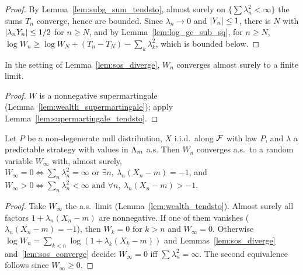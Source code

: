 \begin{proof}
  \leanok
  By Lemma~\ref{lem:subg_sum_tendsto}, almost surely on $\{\sum \lambda_n^2 < \infty\}$ the sums
  $T_n$ converge, hence are bounded. Since $\lambda_n \to 0$ and $\lvert Y_n \rvert \le 1$, there is $N$
  with $\lvert \lambda_n Y_n \rvert \le 1/2$ for $n \ge N$, and by Lemma~\ref{lem:log_ge_sub_sq}, for
  $n \ge N$, $\log W_n \ge \log W_N + (T_n - T_N) - \sum_k \lambda_k^2$, which is bounded below.
\end{proof}

\begin{lemma}
  \label{lem:wealth_tendsto}
  \leanok
  In the setting of Lemma~\ref{lem:sos_diverge}, $W_n$ converges almost surely to a finite limit.
\end{lemma}

\begin{proof}
  \leanok
  $W$ is a nonnegative supermartingale (Lemma~\ref{lem:wealth_supermartingale}); apply
  Lemma~\ref{lem:supermartingale_tendsto}.
\end{proof}

\begin{theorem}
  \label{thm:sos_crit_filtration}
  \leanok
  Let $P$ be a non-degenerate null distribution, $X$ i.i.d.\ along $\mathcal{F}$ with law $P$, and $\lambda$
  a predictable strategy with values in $\Lambda_m$ a.s. Then $W_n$ converges a.s.\ to a random variable
  $W_\infty$ with, almost surely,
  $W_\infty = 0 \iff \sum_n \lambda_n^2 = \infty \text{ or } \exists n,\ \lambda_n(X_n - m) = -1$,
  and $W_\infty > 0 \iff \sum_n \lambda_n^2 < \infty \text{ and } \forall n,\ \lambda_n (X_n - m) >
  -1$.
\end{theorem}

\begin{proof}
  \leanok
  Take $W_\infty$ the a.s.\ limit (Lemma~\ref{lem:wealth_tendsto}). Almost surely all factors
  $1 + \lambda_n(X_n - m)$ are nonnegative. If one of them vanishes ($\lambda_n(X_n - m) = -1$), then
  $W_k = 0$ for $k > n$ and $W_\infty = 0$. Otherwise $\log W_n = \sum_{k<n} \log(1 + \lambda_k(X_k
  - m))$ and Lemmas~\ref{lem:sos_diverge} and~\ref{lem:sos_converge} decide: $W_\infty = 0$ iff
  $\sum \lambda_n^2 = \infty$. The second equivalence follows since $W_\infty \ge 0$.
\end{proof}

